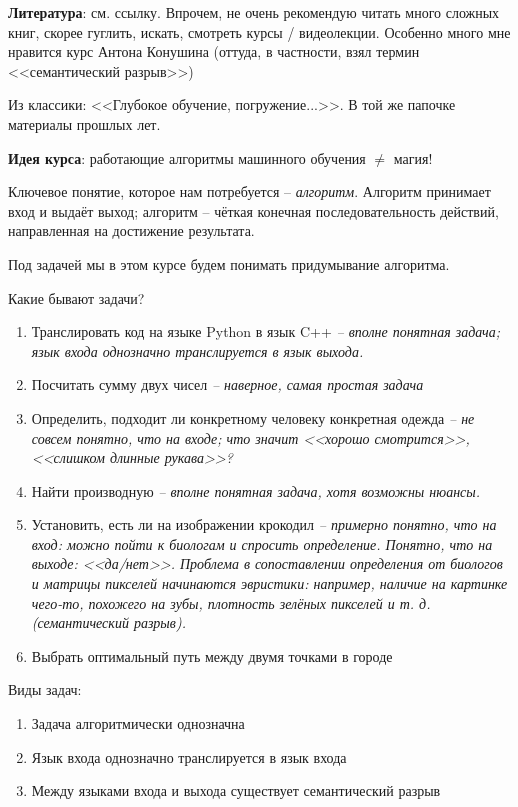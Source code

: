 \documentclass[main.tex]{subfiles}
\begin{document}
\textbf{Литература}: см. ссылку.
Впрочем, не очень рекомендую читать много сложных книг, скорее гуглить, искать, смотреть курсы / видеолекции.
Особенно много мне нравится курс Антона Конушина (оттуда, в частности, взял термин <<семантический разрыв>>) %

Из классики: <<Глубокое обучение, погружение...>>. В той же папочке материалы прошлых лет.

\textbf{Идея курса}: работающие алгоритмы машинного обучения $ \ne $ магия!

Ключевое понятие, которое нам потребуется -- \emph{алгоритм}.
Алгоритм принимает вход и выдаёт выход; алгоритм -- чёткая конечная последовательность действий, направленная на достижение результата.

Под задачей мы в этом курсе будем понимать придумывание алгоритма.

Какие бывают задачи?

\begin{enumerate}[noitemsep]
    \item Транслировать код на языке Python в язык C++ \emph{-- вполне понятная задача; язык входа однозначно транслируется в язык выхода.}
    \item Посчитать сумму двух чисел \emph{ -- наверное, самая простая задача}
    \item Определить, подходит ли конкретному человеку конкретная одежда \emph{-- не совсем понятно, что на входе; что значит <<хорошо смотрится>>, <<слишком длинные рукава>>?}
    \item Найти производную \emph{ -- вполне понятная задача, хотя возможны нюансы. }
    \item Установить, есть ли на изображении крокодил \emph{-- примерно понятно, что на вход: можно пойти к биологам и спросить определение. Понятно, что на выходе: <<да/нет>>. Проблема в сопоставлении определения от биологов и матрицы пикселей \textrightarrow начинаются эвристики: например, наличие на картинке чего-то, похожего на зубы, плотность зелёных пикселей и т. д. (семантический разрыв). }
    \item Выбрать оптимальный путь между двумя точками в городе
\end{enumerate}

Виды задач:

\begin{enumerate}[noitemsep]
    \item Задача алгоритмически однозначна
    \item Язык входа однозначно транслируется в язык входа
    \item Между языками входа и выхода существует семантический разрыв \label{item:semantic}
\end{enumerate}
\end{document}
